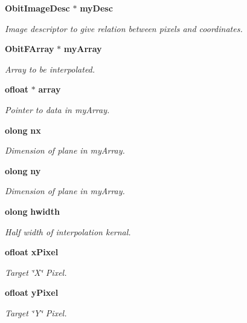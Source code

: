 \begin{CompactItemize}
{\bf Obit\-Image\-Desc} $\ast$ {\bf my\-Desc}
\begin{CompactList}\small\item\em Image descriptor to give relation between pixels and coordinates. \item\end{CompactList}\item 
{\bf Obit\-FArray} $\ast$ {\bf my\-Array}
\begin{CompactList}\small\item\em Array to be interpolated. \item\end{CompactList}\item 
{\bf ofloat} $\ast$ {\bf array}
\begin{CompactList}\small\item\em Pointer to data in my\-Array. \item\end{CompactList}\item 
{\bf olong} {\bf nx}
\begin{CompactList}\small\item\em Dimension of plane in my\-Array. \item\end{CompactList}\item 
{\bf olong} {\bf ny}
\begin{CompactList}\small\item\em Dimension of plane in my\-Array. \item\end{CompactList}\item 
{\bf olong} {\bf hwidth}
\begin{CompactList}\small\item\em Half width of interpolation kernal. \item\end{CompactList}\item 
{\bf ofloat} {\bf x\-Pixel}
\begin{CompactList}\small\item\em Target \char`\"{}X\char`\"{} Pixel. \item\end{CompactList}\item 
{\bf ofloat} {\bf y\-Pixel}
\begin{CompactList}\small\item\em Target \char`\"{}Y\char`\"{} Pixel. \item\end{CompactList}\item 

\end{CompactItemize}
